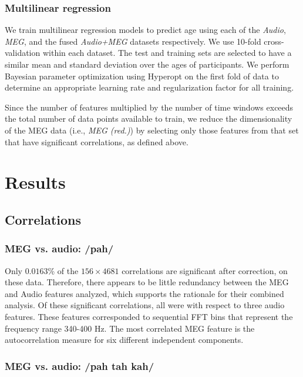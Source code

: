 \documentclass[a4paper]{article}
\begin{document}
\subsubsection{Multilinear regression}

We train multilinear regression models to predict age using each of the \textit{Audio}, \textit{MEG}, and the fused \textit{Audio+MEG} datasets respectively. We use 10-fold cross-validation within each dataset. The test and training sets are selected to have a similar mean and standard deviation over the ages of participants. We perform Bayesian parameter optimization using Hyperopt \cite{Bergstra2013} on the first fold of data to determine an appropriate learning rate and regularization factor for all training. %

Since the number of features multiplied by the number of time windows exceeds the total number of data points available to train, we reduce the dimensionality of the MEG data (i.e., {\em MEG (red.)}) by selecting only those features from that set that have significant correlations, as defined above.

\section{Results}

\subsection{Correlations}

\subsubsection{MEG vs. audio: /pah/}

Only $0.0163$\% of the $156 \times 4681$ correlations are significant after correction, on these data. Therefore, there appears to be little redundancy between the MEG and Audio features analyzed, which supports the rationale for their combined analysis. Of these significant correlations, all were with respect to three audio features. These features corresponded to sequential FFT bins that represent the frequency range 340-400 Hz. The most correlated MEG feature is the autocorrelation measure for six different independent components.

\subsubsection{MEG vs. audio: /pah tah kah/} 
\end{document}
